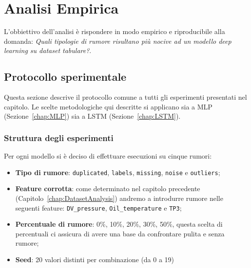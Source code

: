 \documentclass[../main.tex]{subfiles}
\begin{document}
\chapter{Analisi Empirica}
\label{chap:EmpyricAnalysis} %


L'obbiettivo dell'analisi è rispondere in modo empirico e riproducibile alla domanda: \textit{Quali tipologie di rumore risultano più nocive ad un modello deep learning su dataset tabulare?}.

\section{Protocollo sperimentale}
Questa sezione descrive il protocollo comune a tutti gli esperimenti presentati nel capitolo. Le scelte metodologiche qui descritte si applicano sia a MLP (Sezione~\ref{chap:MLP}) sia a LSTM (Sezione~\ref{chap:LSTM}).

\subsection{Struttura degli esperimenti}
Per ogni modello si è deciso di effettuare esecuzioni su cinque rumori:
\begin{itemize}
    \item \textbf{Tipo di rumore}: \texttt{duplicated}, \texttt{labels}, \texttt{missing}, \texttt{noise} e \texttt{outliers};
    
    \item \textbf{Feature corrotta}: come determinato nel capitolo precedente (Capitolo~\ref{chap:DatasetAnalysis}) andremo a introdurre rumore nelle seguenti feature: \texttt{DV\_pressure}, \texttt{Oil\_temperature} e \texttt{TP3};
    
    \item \textbf{Percentuale di rumore}: 0\%, 10\%, 20\%, 30\%, 50\%, questa scelta di percentuali ci assicura di avere una base da confrontare pulita e senza rumore;
    \item \textbf{Seed}: 20 valori distinti per combinazione (da 0 a 19)
\end{itemize}
\end{document}
